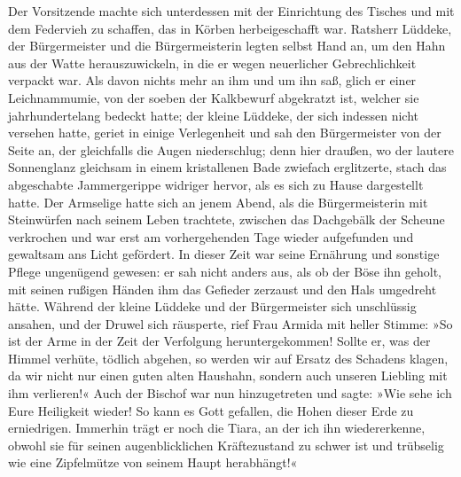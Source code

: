 Der Vorsitzende machte sich unterdessen mit der Einrichtung des
Tisches und mit dem Federvieh zu schaffen, das in Körben
herbeigeschafft war. Ratsherr Lüddeke, der Bürgermeister und die
Bürgermeisterin legten selbst Hand an, um den Hahn aus der Watte
herauszuwickeln, in die er wegen neuerlicher Gebrechlichkeit
verpackt war. Als davon nichts mehr an ihm und um ihn saß, glich er
einer Leichnammumie, von der soeben der Kalkbewurf abgekratzt ist,
welcher\pagenum{[46]} sie jahrhundertelang bedeckt hatte; der
kleine Lüddeke, der sich indessen nicht versehen hatte, geriet in
einige Verlegenheit und sah den Bürgermeister von der Seite an, der
gleichfalls die Augen niederschlug; denn hier draußen, wo der
lautere Sonnenglanz gleichsam in einem kristallenen Bade zwiefach
erglitzerte, stach das abgeschabte Jammergerippe widriger hervor,
als es sich zu Hause dargestellt hatte. Der Armselige hatte sich an
jenem Abend, als die Bürgermeisterin mit Steinwürfen nach seinem
Leben trachtete, zwischen das Dachgebälk der Scheune verkrochen und
war erst am vorhergehenden Tage wieder aufgefunden und gewaltsam
ans Licht gefördert. In dieser Zeit war seine Ernährung und
sonstige Pflege ungenügend gewesen: er sah nicht anders aus, als ob
der Böse ihn geholt, mit seinen rußigen Händen ihm das Gefieder
zerzaust und den Hals umgedreht hätte. Während der kleine Lüddeke
und der Bürgermeister sich unschlüssig ansahen, und der Druwel sich
räusperte, rief Frau Armida mit heller Stimme: »So ist der Arme in
der Zeit der Verfolgung heruntergekommen! Sollte er, was der Himmel
verhüte, tödlich abgehen, so werden wir auf Ersatz des Schadens
klagen, da wir nicht nur einen guten alten Haushahn, sondern auch
unseren Liebling mit ihm verlieren!« Auch der Bischof war nun
hinzugetreten und sagte: »Wie sehe ich Eure Heiligkeit wieder! So
kann es Gott gefallen, die Hohen dieser Erde zu erniedrigen.
Immerhin trägt er noch die Tiara, an der ich ihn wiedererkenne,
obwohl sie für seinen augenblicklichen Kräftezustand zu schwer ist
und trübselig wie eine Zipfelmütze von seinem Haupt herabhängt!«

